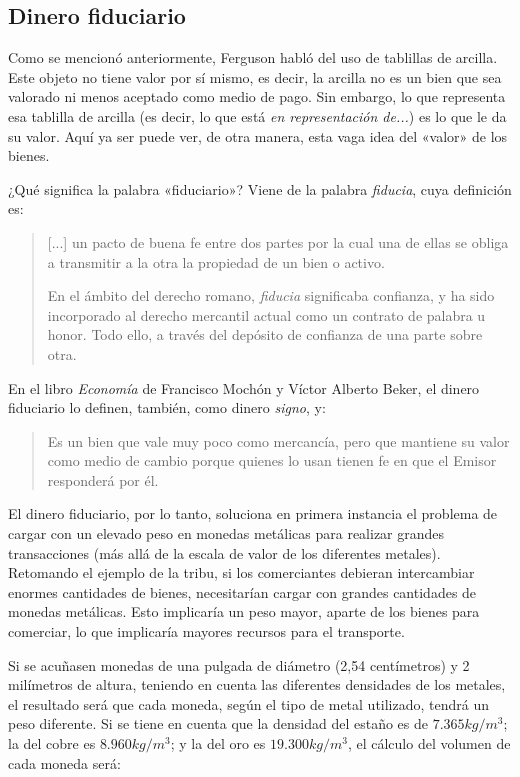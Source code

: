 \documentclass[12pt,a4paper,twoside]{book}
\begin{document}
\subsection{Dinero fiduciario}
Como se mencionó anteriormente, Ferguson habló del uso de tablillas de arcilla. Este objeto no tiene valor por sí mismo, es decir, la arcilla no es un bien que sea valorado ni menos aceptado como medio de pago. Sin embargo, lo que representa esa tablilla de arcilla (es decir, lo que está \textit{en representación de...}) es lo que le da su valor. Aquí ya ser puede ver, de otra manera, esta vaga idea del «valor» de los bienes.

¿Qué significa la palabra «fiduciario»? Viene de la palabra \textit{fiducia}, cuya definición es:

\begin{quotation}
[...] un pacto de buena fe entre dos partes por la cual una de ellas se obliga a transmitir a la otra la propiedad de un bien o activo.

En el ámbito del derecho romano, \textit{fiducia} significaba confianza, y ha sido incorporado al derecho mercantil actual como un contrato de palabra u honor. Todo ello, a través del depósito de confianza de una parte sobre otra. \cite{epedia:fiducia}
\end{quotation}

En el libro \textit{Economía} de Francisco Mochón y Víctor Alberto Beker, el dinero fiduciario lo definen, también, como dinero \textit{signo}, y:

\begin{quote}
Es un bien que vale muy poco como mercancía, pero que mantiene su valor como medio de cambio porque quienes lo usan tienen fe en que el Emisor responderá por él. \cite[pág. 265]{mochobeker}
\end{quote}

El dinero fiduciario, por lo tanto, soluciona en primera instancia el problema de cargar con un elevado peso en monedas metálicas para realizar grandes transacciones (más allá de la escala de valor de los diferentes metales). Retomando el ejemplo de la tribu, si los comerciantes debieran intercambiar enormes cantidades de bienes, necesitarían cargar con grandes cantidades de monedas metálicas. Esto implicaría un peso mayor, aparte de los bienes para comerciar, lo que implicaría mayores recursos para el transporte.

Si se acuñasen monedas de una pulgada de diámetro (2,54 centímetros) y 2 milímetros de altura, teniendo en cuenta las diferentes densidades de los metales, el resultado será que cada moneda, según el tipo de metal utilizado, tendrá un peso diferente. Si se tiene en cuenta que la densidad del estaño es de $ 7.365 kg/m^3 $; la del cobre es $ 8.960 kg/m^3 $; y la del oro es $ 19.300 kg/m^3 $, el cálculo del volumen de cada moneda será:
\end{document}
